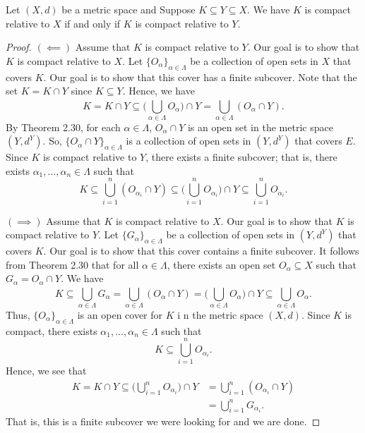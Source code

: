 \documentclass[a4paper]{report}
\begin{document}
\begin{theorem}[ ]\label{Theorem 2.33}
   Let \( (X,d) \) be a metric space and Suppose \( K \subseteq Y \subseteq X  \). We have \( K  \) is compact relative to \( X  \) if and only if \( K  \) is compact relative to \( Y  \).
\end{theorem}
\begin{proof}
    \( (\impliedby) \) Assume that \( K  \) is compact relative to \( Y  \). Our goal is to show that \( K  \) is compact relative to \( X  \). Let \( \{ {O}_{\alpha} \}_{\alpha \in \Lambda} \) be a collection of open sets in \( X  \) that covers \( K  \). Our goal is to show that this cover has a finite subcover. Note that the set \(  K = K \cap Y  \) since \( K \subseteq  Y  \). Hence, we have 
    \[  K = K \cap Y \subseteq  \Big(  \bigcup_{ \alpha \in \Lambda }^{  }  {O}_{\alpha} \Big) \cap Y = \bigcup_{ \alpha \in \Lambda }^{  }  ({O}_{\alpha} \cap Y). \]
    By Theorem 2.30, for each \( \alpha \in \Lambda  \), \( {O}_{\alpha} \cap Y  \) is an open set in the metric space \( (Y, d^{Y}) \). So, \( \{ {O}_{\alpha} \cap Y  \}_{\alpha \in \Lambda}  \) is a collection of open sets in \( (Y, d^{Y}) \) that covers \( E  \). Since \( K  \) is compact relative to \( Y  \), there exists a finite subcover; that is, there exists \( {\alpha}_{1}, \dots, {\alpha}_{n} \in \Lambda \) such that  
    \[  K \subseteq  \bigcup_{ i =1  }^{ n }  ({O}_{{\alpha}_{i}} \cap Y) \subseteq \Big(  \bigcup_{ i=1  }^{ n }  {O}_{{\alpha}_{i}} \Big) \cap Y \subseteq  \bigcup_{ i=1  }^{ n }  {O}_{{\alpha}_{i}}.    \]

    \( (\implies) \) Assume that \( K  \) is compact relative to \( X  \). Our goal is to show that \( K   \) is compact relative to \( Y  \). Let \( \{ {G}_{\alpha} \}_{\alpha \in \Lambda} \) be a collection of open sets in \( (Y, d^{Y})  \) that covers \( K  \). Our goal is to show that this cover contains a finite subcover. It follows from Theorem 2.30 that for all \( \alpha \in \Lambda  \), there exists an open set \( {O}_{\alpha} \subseteq X  \) such that \( {G}_{\alpha} = {O}_{\alpha} \cap Y  \). We have 
    \[  K \subseteq  \bigcup_{ \alpha \in \Lambda  }^{  }  {G}_{\alpha} = \bigcup_{ \alpha \in \Lambda  }^{  }  ({O}_{\alpha} \cap Y ) = \Big(  \bigcup_{ \alpha \in \Lambda  }^{  }  {O}_{\alpha} \Big) \cap Y \subseteq  \bigcup_{ \alpha \in \Lambda  }^{  }  {O}_{\alpha}. \]
    Thus, \( \{ {O}_{\alpha} \}_{\alpha \in \Lambda} \) is an open cover for \( K  \) i n the metric space \( (X,d) \). Since \( K  \) is compact, there exists \( {\alpha}_{1}, \dots, {\alpha}_{n} \in \Lambda  \) such that 
    \[  K \subseteq  \bigcup_{ i=1  }^{ n }  {O}_{{\alpha}_{i}}. \]
    Hence, we see that 
    \begin{align*}
        K = K \cap Y \subseteq  \Big(  \bigcup_{ i=1  }^{ n }  {O}_{{\alpha}_{i}} \Big) \cap Y &= \bigcup_{ i=1 }^{ n }  ({O}_{{\alpha}_{i}} \cap Y ) \\
                                                                                               &= \bigcup_{ i=1  }^{ n }  {G}_{{\alpha}_{i}}.
    \end{align*}
    That is, this is a finite subcover we were looking for and we are done.
\end{proof}
\end{document}
